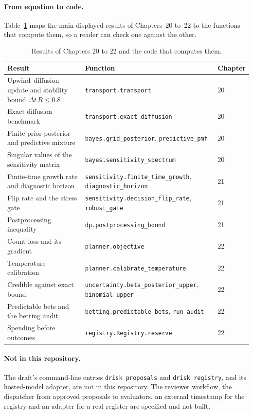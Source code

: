 \paragraph{From equation to code.} Table~\ref{app:tab-eqmap} maps the main displayed results of Chapters~20 to~22 to the functions that compute them, so a reader can check one against the other.

\begin{table}[ht]
\centering\small
\caption{Results of Chapters 20 to 22 and the code that computes them.}
\label{app:tab-eqmap}
\begin{tabular}{p{4.6cm}p{5.2cm}p{3.0cm}}
\toprule
Result & Function & Chapter\\
\midrule
Upwind--diffusion update and stability bound $\Delta t\,R\le0.8$ & \texttt{transport.transport} & 20\\
Exact diffusion benchmark & \texttt{transport.exact\_diffusion} & 20\\
Finite-prior posterior and predictive mixture & \texttt{bayes.grid\_posterior}, \texttt{predictive\_pmf} & 20\\
Singular values of the sensitivity matrix & \texttt{bayes.sensitivity\_spectrum} & 20\\
Finite-time growth rate and diagnostic horizon & \texttt{sensitivity.finite\_time\_growth}, \texttt{diagnostic\_horizon} & 21\\
Flip rate and the stress gate & \texttt{sensitivity.decision\_flip\_rate}, \texttt{robust\_gate} & 21\\
Postprocessing inequality & \texttt{dp.postprocessing\_bound} & 21\\
Count loss and its gradient & \texttt{planner.objective} & 22\\
Temperature calibration & \texttt{planner.calibrate\_temperature} & 22\\
Credible against exact bound & \texttt{uncertainty.beta\_posterior\_upper}, \texttt{binomial\_upper} & 22\\
Predictable bets and the betting audit & \texttt{betting.predictable\_bets}, \texttt{run\_audit} & 22\\
Spending before outcomes & \texttt{registry.Registry.reserve} & 22\\
\bottomrule
\end{tabular}
\end{table}

\paragraph{Not in this repository.} The draft's command-line entries \texttt{drisk proposals} and \texttt{drisk registry}, and its hosted-model adapter, are not in this repository. The reviewer workflow, the dispatcher from approved proposals to evaluators, an external timestamp for the registry and an adapter for a real register are specified and not built.

